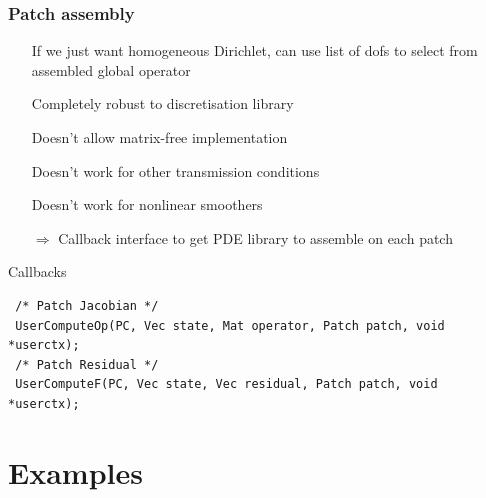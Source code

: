 \documentclass[presentation,aspectratio=43, 10pt]{beamer}
\newcommand{\cmark}{\ding{51}}
\newcommand{\xmark}{\ding{55}}
\begin{document}
\begin{frame}[fragile]
  \frametitle{Patch assembly}
  \begin{itemize}
  \item[\cmark] If we just want homogeneous Dirichlet, can use list of dofs to
    select from assembled global operator
  \item[\cmark] Completely robust to discretisation library
  \item[\xmark] Doesn't allow matrix-free implementation
  \item[\xmark] Doesn't work for other transmission conditions
  \item[\xmark] Doesn't work for nonlinear smoothers
  \item[$\Rightarrow$] Callback interface to get PDE library to
    assemble on each patch
  \end{itemize}
  \begin{block}{Callbacks}
\begin{verbatim}
 /* Patch Jacobian */
 UserComputeOp(PC, Vec state, Mat operator, Patch patch, void *userctx);
 /* Patch Residual */
 UserComputeF(PC, Vec state, Vec residual, Patch patch, void *userctx);
\end{verbatim}
  \end{block}
\end{frame}

\section{Examples}
\end{document}
